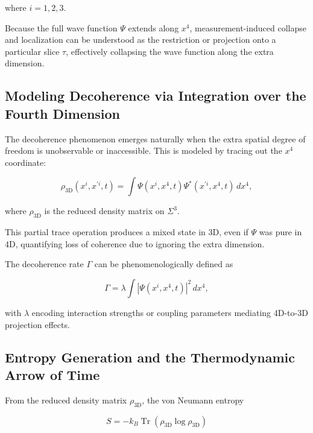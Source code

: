 \documentclass[12pt,a4paper]{article}
\numberwithin{equation}{section}
\begin{document}
where \(i=1,2,3\).

Because the full wave function \(\Psi\) extends along \(x^4\), measurement-induced collapse and localization can be understood as the restriction or projection onto a particular slice \(\tau\), effectively collapsing the wave function along the extra dimension.

\subsection{Modeling Decoherence via Integration over the Fourth Dimension}

The decoherence phenomenon emerges naturally when the extra spatial degree of freedom is unobservable or inaccessible. This is modeled by tracing out the \(x^4\) coordinate:

\begin{equation}
    \rho_\mathrm{3D}(x^i, x^{\prime i}, t) = \int \Psi(x^i, x^4, t) \Psi^*(x^{\prime i}, x^4, t) \, dx^4,
    \label{eq:reduced_density_matrix}
\end{equation}

where \(\rho_\mathrm{3D}\) is the reduced density matrix on \(\Sigma^3\).

This partial trace operation produces a mixed state in 3D, even if \(\Psi\) was pure in 4D, quantifying loss of coherence due to ignoring the extra dimension.

The decoherence rate \(\Gamma\) can be phenomenologically defined as

\begin{equation}
    \Gamma = \lambda \int |\Psi(x^i, x^4, t)|^2 \, dx^4,
    \label{eq:decoherence_rate_definition}
\end{equation}

with \(\lambda\) encoding interaction strengths or coupling parameters mediating 4D-to-3D projection effects.

\subsection{Entropy Generation and the Thermodynamic Arrow of Time}

From the reduced density matrix \(\rho_\mathrm{3D}\), the von Neumann entropy

\begin{equation}
    S = -k_B \operatorname{Tr}\left(\rho_\mathrm{3D} \log \rho_\mathrm{3D}\right)
    \label{eq:von_neumann_entropy_def}
\end{equation}
\end{document}
